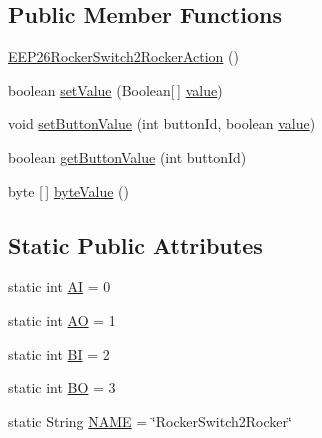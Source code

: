 \subsection*{Public Member Functions}
\begin{DoxyCompactItemize}
\item 
\hyperlink{classit_1_1polito_1_1elite_1_1enocean_1_1enj_1_1eep_1_1eep26_1_1attributes_1_1_e_e_p26_rocker_switch2_rocker_action_a12aba67d3b61938f31c20f75b733ce5b}{E\+E\+P26\+Rocker\+Switch2\+Rocker\+Action} ()
\item 
boolean \hyperlink{classit_1_1polito_1_1elite_1_1enocean_1_1enj_1_1eep_1_1eep26_1_1attributes_1_1_e_e_p26_rocker_switch2_rocker_action_a7a7b41f357aa3643f55f934c61d41d84}{set\+Value} (Boolean\mbox{[}$\,$\mbox{]} \hyperlink{classit_1_1polito_1_1elite_1_1enocean_1_1enj_1_1eep_1_1_e_e_p_attribute_af4d7e34642004bb6ccfae51e925c983d}{value})
\item 
void \hyperlink{classit_1_1polito_1_1elite_1_1enocean_1_1enj_1_1eep_1_1eep26_1_1attributes_1_1_e_e_p26_rocker_switch2_rocker_action_afc95a51ad47899ed591c50711308f67f}{set\+Button\+Value} (int button\+Id, boolean \hyperlink{classit_1_1polito_1_1elite_1_1enocean_1_1enj_1_1eep_1_1_e_e_p_attribute_af4d7e34642004bb6ccfae51e925c983d}{value})
\item 
boolean \hyperlink{classit_1_1polito_1_1elite_1_1enocean_1_1enj_1_1eep_1_1eep26_1_1attributes_1_1_e_e_p26_rocker_switch2_rocker_action_ab8b3883743ece996e2add3991c4ebc7b}{get\+Button\+Value} (int button\+Id)
\item 
byte \mbox{[}$\,$\mbox{]} \hyperlink{classit_1_1polito_1_1elite_1_1enocean_1_1enj_1_1eep_1_1eep26_1_1attributes_1_1_e_e_p26_rocker_switch2_rocker_action_a2e42624a0363899513241e629d7231cc}{byte\+Value} ()
\end{DoxyCompactItemize}
\subsection*{Static Public Attributes}
\begin{DoxyCompactItemize}
\item 
static int \hyperlink{classit_1_1polito_1_1elite_1_1enocean_1_1enj_1_1eep_1_1eep26_1_1attributes_1_1_e_e_p26_rocker_switch2_rocker_action_ac3e7aebcc415e9d15f73c2d6c1c36016}{AI} = 0
\item 
static int \hyperlink{classit_1_1polito_1_1elite_1_1enocean_1_1enj_1_1eep_1_1eep26_1_1attributes_1_1_e_e_p26_rocker_switch2_rocker_action_a128ec16ca97da1774275fa4febf53123}{AO} = 1
\item 
static int \hyperlink{classit_1_1polito_1_1elite_1_1enocean_1_1enj_1_1eep_1_1eep26_1_1attributes_1_1_e_e_p26_rocker_switch2_rocker_action_aeca9ddb001ac86f906c22fd1965a76bd}{BI} = 2
\item 
static int \hyperlink{classit_1_1polito_1_1elite_1_1enocean_1_1enj_1_1eep_1_1eep26_1_1attributes_1_1_e_e_p26_rocker_switch2_rocker_action_a822242bab6d2aa944baaa82818e215c7}{BO} = 3
\item 
static String \hyperlink{classit_1_1polito_1_1elite_1_1enocean_1_1enj_1_1eep_1_1eep26_1_1attributes_1_1_e_e_p26_rocker_switch2_rocker_action_ad4c7f1830e4658e952b66bc5d3a4fd09}{N\+A\+ME} = \char`\"{}Rocker\+Switch2\+Rocker\char`\"{}
\end{DoxyCompactItemize}
